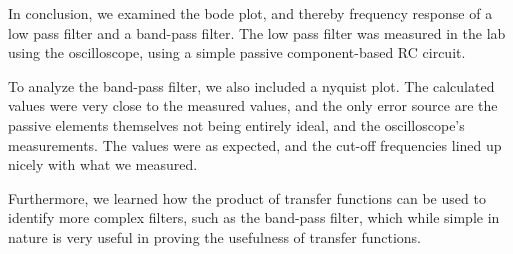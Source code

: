 In conclusion, we examined the bode plot, and thereby frequency response of a low pass filter and a band-pass filter.
The low pass filter was measured in the lab using the oscilloscope, using a simple passive component-based RC circuit.


To analyze the band-pass filter, we also included a nyquist plot. The calculated values were very close to the measured values, and the only error source are the passive elements themselves not being entirely ideal,
and the oscilloscope's measurements. The values were as expected, and the cut-off frequencies lined up nicely with what we measured.

Furthermore, we learned how the product of transfer functions can be used to identify more complex filters, such as the band-pass filter, which while
simple in nature is very useful in proving the usefulness of transfer functions.